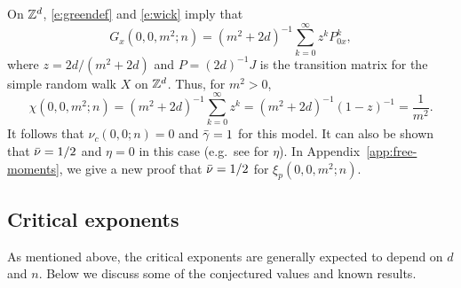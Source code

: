 \begin{example}
\label{ex:gff-asymp}
On ${ {{\mathbb Z}}^d }$, \eqref{e:greendef} and \eqref{e:wick} imply that
\begin{equation}
G_x(0, 0, m^2; n)
	=
(m^2 + 2 d)^{-1} \sum_{k=0}^\infty z^k P^k_{0x},
\end{equation}
where $z = 2 d / (m^2 + 2 d)$ and $P = (2 d)^{-1} J$
is the transition matrix for the simple random walk $X$ on ${ {{\mathbb Z}}^d }$.
Thus, for $m^2 > 0$,
\begin{equation}
\label{e:chi-free}
\chi(0, 0, m^2; n)
	=
(m^2 + 2 d)^{-1} \sum_{k=0}^\infty z^k
	=
(m^2 + 2 d)^{-1} (1 - z)^{-1}
	=
\frac{1}{m^2}.
\end{equation}
It follows that $\nu_c(0, 0; n) = 0$ and $\bar\gamma = 1$ for this model.
It can also be shown that $\bar\nu = 1/2$ and $\eta = 0$ in this case
(e.g.\ see \cite{Lawl85} for $\eta$).
In Appendix~\ref{app:free-moments}, we give a new
proof that $\bar\nu = 1/2$ for $\xi_p(0, 0, m^2; n)$.
\end{example}


\subsection{Critical exponents}
\label{sec:dimension}

As mentioned above, the critical exponents are generally expected to depend on
$d$ and $n$. Below we discuss some of the conjectured values and known results.


